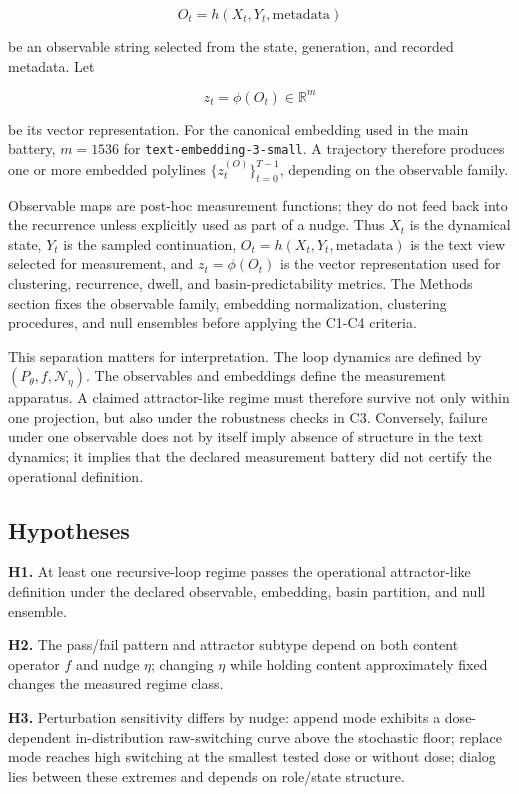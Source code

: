\documentclass{article}
\theoremstyle{plain}
\theoremstyle{definition}
\begin{document}
\[O_t=h(X_t,Y_t,\mathrm{metadata})\]

be an observable string selected from the state, generation, and recorded metadata. Let

\[z_t=\phi(O_t)\in\mathbb{R}^m\]

be its vector representation. For the canonical embedding used in the main battery, \(m=1536\) for \texttt{text-embedding-3-small}. A trajectory therefore produces one or more embedded polylines \(\{z_t^{(O)}\}_{t=0}^{T-1}\), depending on the observable family.

Observable maps are post-hoc measurement functions; they do not feed back into the recurrence unless explicitly used as part of a nudge. Thus \(X_t\) is the dynamical state, \(Y_t\) is the sampled continuation, \(O_t=h(X_t,Y_t,\mathrm{metadata})\) is the text view selected for measurement, and \(z_t=\phi(O_t)\) is the vector representation used for clustering, recurrence, dwell, and basin-predictability metrics. The Methods section fixes the observable family, embedding normalization, clustering procedures, and null ensembles before applying the C1-C4 criteria.

This separation matters for interpretation. The loop dynamics are defined by \((P_\theta,f,\mathcal{N}_\eta)\). The observables and embeddings define the measurement apparatus. A claimed attractor-like regime must therefore survive not only within one projection, but also under the robustness checks in C3. Conversely, failure under one observable does not by itself imply absence of structure in the text dynamics; it implies that the declared measurement battery did not certify the operational definition.

\subsection{Hypotheses}

\textbf{H1.} At least one recursive-loop regime passes the operational attractor-like definition under the declared observable, embedding, basin partition, and null ensemble.

\textbf{H2.} The pass/fail pattern and attractor subtype depend on both content operator \(f\) and nudge \(\eta\); changing \(\eta\) while holding content approximately fixed changes the measured regime class.

\textbf{H3.} Perturbation sensitivity differs by nudge: append mode exhibits a dose-dependent in-distribution raw-switching curve above the stochastic floor; replace mode reaches high switching at the smallest tested dose or without dose; dialog lies between these extremes and depends on role/state structure.
\end{document}
